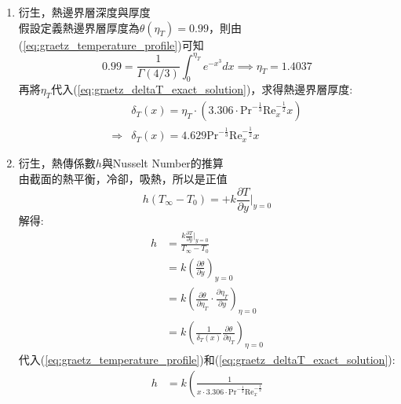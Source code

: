 \documentclass[../main.tex]{subfiles}
\begin{document}
\begin{itemize}
\begin{enumerate}
  解出來的解為:
  \begin{equation}
    \theta(\infty) = 1 = A \int_0^\infty e^{-\eta_T^3} d\eta_T = A\Gamma\left(\frac{4}{3}\right)
  \end{equation}
  所以$A = \frac{1}{\Gamma(4/3)}$
  \begin{equation}
    \boxed{\theta(\eta_T) = \frac{1}{\Gamma(4/3)} \int_0^{\eta_T} e^{-\eta_T^3} d\eta_T} \label{eq:graetz_temperature_profile}
  \end{equation}
  \item 衍生，熱邊界層深度與厚度\\
  假設定義熱邊界層厚度為$\theta(\eta_T) = 0.99$，則由(\ref{eq:graetz_temperature_profile})可知
  \begin{equation}
    0.99 = \frac{1}{\Gamma(4/3)} \int_0^{\eta_{T}} e^{-x^3} dx \implies \eta_T=1.4037
  \end{equation}
  再將$\eta_T$代入(\ref{eq:graetz_deltaT_exact_solution})，求得熱邊界層厚度:
  \begin{align}
    & \delta_T(x) = \eta_T \cdot \left(
      3.306 \cdot \text{Pr}^{-\frac{1}{3}} \text{Re}_x^{-\frac{1}{2}} x
    \right) \nonumber\\
    \Rightarrow & \boxed{\delta_T(x) = 4.629 \text{Pr}^{-\frac{1}{3}} \text{Re}_x^{-\frac{1}{2}} x} \label{eq:graetz_deltaT_final}
  \end{align}
  \item 衍生，熱傳係數$h$與Nusselt Number的推算\\
  由截面的熱平衡，冷卻，吸熱，所以是正值
  \begin{equation}
    h(T_\infty -T_0) = +k\frac{\partial T}{\partial y}\bigg|_{y=0}
  \end{equation}
  解得:
  \begin{align}
    h &= \frac{k\frac{\partial T}{\partial y}\bigg|_{y=0}}{T_\infty - T_0} \nonumber\\
    &= k\left(\frac{\partial \theta}{\partial y}\right)_{y=0} \nonumber\\
    &= k\left(
      \frac{\partial \theta}{\partial \eta_T} \cdot \frac{\partial \eta_T}{\partial y}
    \right)_{\eta=0} \nonumber\\
    &= k\left(
      \frac{1}{\delta_T(x)} \frac{\partial \theta}{\partial \eta_T}
    \right)_{\eta=0}
  \end{align}
  代入(\ref{eq:graetz_temperature_profile})和(\ref{eq:graetz_deltaT_exact_solution}):
  \begin{align}
    h &= k\left(
      \frac{1}{x\cdot 3.306 \cdot \text{Pr}^{-\frac{1}{3}} \text{Re}_x^{-\frac{1}{2}}} 

\end{align}
\end{enumerate}
\end{itemize}
\end{document}

